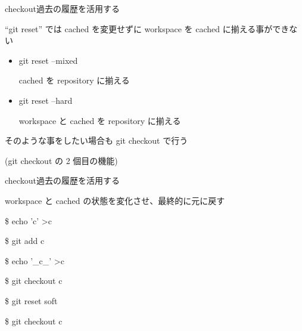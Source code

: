 
\begin{frame}[t]{checkout}{過去の履歴を活用する}

  ``git reset'' では cached を変更せずに workspace を cached に揃える事ができない

  \vspace{2ex}

  \begin{itemize}
  \item git reset --mixed

    cached を repository に揃える
  \item git reset --hard

    workspace と cached を repository に揃える
  \end{itemize}

  \vspace{2ex}

  そのような事をしたい場合も git checkout で行う

  (git checkout の 2 個目の機能)

\end{frame}


\begin{frame}[t]{checkout}{過去の履歴を活用する}

  workspace と cached の状態を変化させ、最終的に元に戻す

  \vspace{4ex}

  \$ echo 'c' \textgreater \space c

  \$ git add c

  \vspace{2ex}

  \$ echo '\_c\_' \textgreater \space c

  \$ git checkout c

  \vspace{2ex}

  \$ git reset {\dhyphen}soft

  \$ git checkout c

\end{frame}



